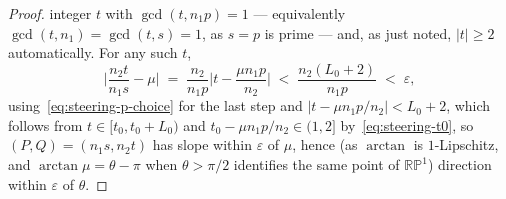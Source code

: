 \documentclass[10pt,a4paper]{amsart}
\newcommand{\RP}{\mathbb{RP}^1}
\begin{document}
\begin{proof}
  integer \(t\) with \(\gcd(t,n_1p)=1\) --- equivalently \(\gcd(t,n_1)=\gcd(t,s)=1\), as \(s=p\) is prime
  --- and, as just noted, \(|t|\ge2\) automatically. For any such \(t\),
  \begin{equation}
    \label{eq:steering-final-bound}
    \Big|\frac{n_2t}{n_1s}-\mu\Big| \;=\; \frac{n_2}{n_1p}\Big|t-\frac{\mu n_1p}{n_2}\Big| \;<\;
    \frac{n_2(L_0+2)}{n_1p} \;<\; \varepsilon,
  \end{equation}
  using~\eqref{eq:steering-p-choice} for the last step and \(\big|t-\mu n_1p/n_2\big|<L_0+2\), which
  follows from \(t\in[t_0,t_0+L_0)\) and \(t_0-\mu n_1p/n_2\in(1,2]\) by~\eqref{eq:steering-t0}, so
  \((P,Q)=(n_1s,n_2t)\) has slope within \(\varepsilon\) of \(\mu\), hence (as \(\arctan\) is
  \(1\)-Lipschitz, and \(\arctan\mu=\theta-\pi\) when \(\theta>\pi/2\) identifies the same point of
  \(\RP\)) direction within \(\varepsilon\) of \(\theta\).
\end{proof}
\end{document}

